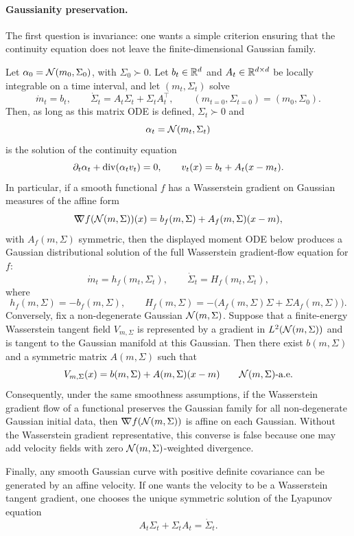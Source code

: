 \paragraph{Gaussianity preservation.}

The first question is invariance: one wants a simple criterion ensuring that the continuity equation does not leave the finite-dimensional Gaussian family.


\begin{prop}\label{prop-gaussian-affine-closure}
	Let $\alpha_0=\mathcal{N}(m_0,\Sigma_0)$, with $\Sigma_0\succ0$. Let $b_t\in\mathbb{R}^d$ and $A_t\in\mathbb{R}^{d\times d}$ be locally integrable on a time interval, and let $(m_t,\Sigma_t)$ solve
	\[
		\dot m_t=b_t,
		\qquad
		\dot\Sigma_t=A_t\Sigma_t+\Sigma_tA_t^\top,
		\qquad
		(m_{t=0},\Sigma_{t=0})=(m_0,\Sigma_0).
	\]
	Then, as long as this matrix ODE is defined, $\Sigma_t\succ0$ and
	\[
		\alpha_t=\mathcal{N}(m_t,\Sigma_t)
	\]
	is the solution of the continuity equation
	\[
		\partial_t\alpha_t+\operatorname{div}(\alpha_t v_t)=0,
		\qquad
		v_t(x)=b_t+A_t(x-m_t).
	\]
	In particular, if a smooth functional $f$ has a Wasserstein gradient on Gaussian measures of the affine form
	\[
		\mathord{\nabla\mkern-9.3mu\nabla} f(\mathcal{N}(m,\Sigma))(x)
		=
		b_f(m,\Sigma)+A_f(m,\Sigma)(x-m),
	\]
	with $A_f(m,\Sigma)$ symmetric, then the displayed moment ODE below produces a Gaussian distributional solution of the full Wasserstein gradient-flow equation for $f$:
	\[
		\dot m_t=h_f(m_t,\Sigma_t),
		\qquad
		\dot\Sigma_t=H_f(m_t,\Sigma_t),
	\]
	where
	\[
		h_f(m,\Sigma)=-b_f(m,\Sigma),
		\qquad
		H_f(m,\Sigma)
		=
		-\bigl(A_f(m,\Sigma)\Sigma+\Sigma A_f(m,\Sigma)\bigr).
	\]
	Conversely, fix a non-degenerate Gaussian \(\mathcal{N}(m,\Sigma)\). Suppose that a finite-energy Wasserstein tangent field \(V_{m,\Sigma}\) is represented by a gradient in \(L^2(\mathcal{N}(m,\Sigma))\) and is tangent to the Gaussian manifold at this Gaussian. Then there exist \(b(m,\Sigma)\) and a symmetric matrix \(A(m,\Sigma)\) such that
	\[
		V_{m,\Sigma}(x)=b(m,\Sigma)+A(m,\Sigma)(x-m)
		\qquad
		\mathcal{N}(m,\Sigma)\text{-a.e.}
	\]
	Consequently, under the same smoothness assumptions, if the Wasserstein gradient flow of a functional preserves the Gaussian family for all non-degenerate Gaussian initial data, then \(\mathord{\nabla\mkern-9.3mu\nabla} f(\mathcal{N}(m,\Sigma))\) is affine on each Gaussian. Without the Wasserstein gradient representative, this converse is false because one may add velocity fields with zero \(\mathcal{N}(m,\Sigma)\)-weighted divergence.

	Finally, any smooth Gaussian curve with positive definite covariance can be generated by an affine velocity. If one wants the velocity to be a Wasserstein tangent gradient, one chooses the unique symmetric solution of the Lyapunov equation
	\[
		A_t\Sigma_t+\Sigma_t A_t=\dot\Sigma_t.
	\]
\end{prop}

